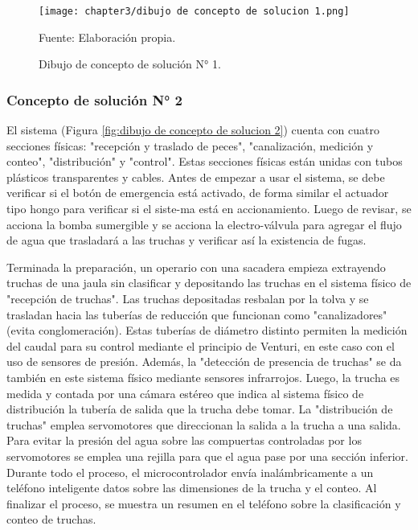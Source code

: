 \begin{figure}[H]
	\centering
	\texttt{[image: chapter3/dibujo de concepto de solucion 1.png]}
	\caption{Dibujo de concepto de solución N° 1.}
	\begin{myflushleftportland}
		Fuente: Elaboración propia.
	\end{myflushleftportland}
	\label{fig:dibujo de concepto de solucion 1}
\end{figure}


\subsubsection{Concepto de solución N° 2}

El sistema (Figura \ref{fig:dibujo de concepto de solucion 2}) cuenta con cuatro secciones físicas: "recepción y traslado de peces", "canalización, medición y conteo", "distribución" y "control". Estas secciones físicas están unidas con tubos plásticos transparentes y cables. Antes de empezar a usar el sistema, se debe verificar si el botón de emergencia está activado, de forma similar el actuador tipo hongo para verificar si el siste-ma está en accionamiento. Luego de revisar, se acciona la bomba sumergible y se acciona la electro-válvula para agregar el flujo de agua que trasladará a las truchas y verificar así la existencia de fugas.

Terminada la preparación, un operario con una sacadera empieza extrayendo truchas de una jaula sin clasificar y depositando las truchas en el sistema físico de "recepción de truchas". Las truchas depositadas resbalan por la tolva y se trasladan hacia las tuberías de reducción que funcionan como "canalizadores" (evita conglomeración). Estas tuberías de diámetro distinto permiten la medición del caudal para su control mediante el principio de Venturi, en este caso con el uso de sensores de presión. Además, la "detección de presencia de truchas" se da también en este sistema físico mediante sensores infrarrojos. Luego, la trucha es medida y contada por una cámara estéreo que indica al sistema físico de distribución la tubería de salida que la trucha debe tomar. La "distribución de truchas" emplea servomotores que direccionan la salida a la trucha a una salida. Para evitar la presión del agua sobre las compuertas controladas por los servomotores se emplea una rejilla para que el agua pase por una sección inferior. 
Durante todo el proceso, el microcontrolador envía inalámbricamente a un teléfono inteligente datos sobre las dimensiones de la trucha y el conteo. Al finalizar el proceso, se muestra un resumen en el teléfono sobre la clasificación y conteo de truchas.

